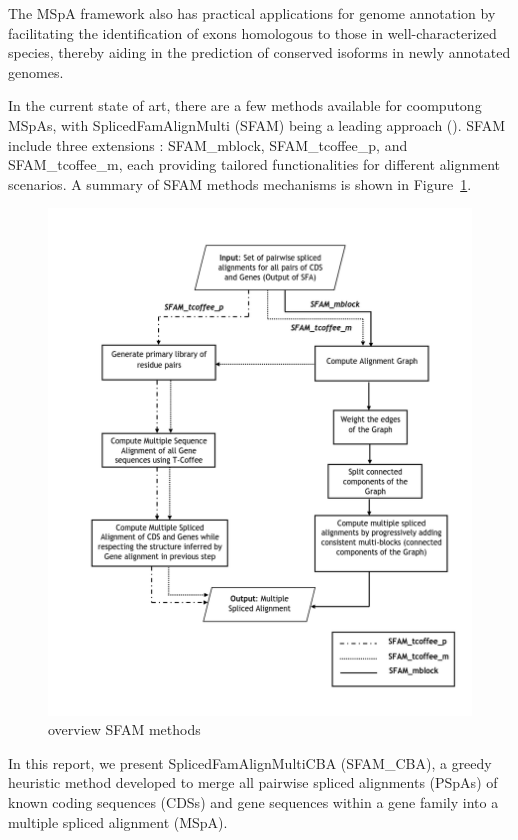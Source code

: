 The MSpA framework also has practical applications for genome annotation by facilitating the identification of exons homologous 
to those in well-characterized species, thereby aiding in the prediction of conserved isoforms in newly annotated genomes.

In the current state of art, there are a few methods available for coomputong MSpAs, with SplicedFamAlignMulti (SFAM) being a 
leading approach (\textit{\citep{jammali2022pairwise}}). SFAM include three extensions : SFAM\_mblock, SFAM\_tcoffee\_p, 
and SFAM\_tcoffee\_m, each providing tailored functionalities for different alignment scenarios. A summary of SFAM methods 
mechanisms is shown in Figure~\ref{fig:spfam-ov}.

\begin{figure}
    \centering
    \includegraphics[width=0.3\linewidth]{figures/overview_spFam_methods.png}
    \caption{overview SFAM methods}
    \label{fig:spfam-ov}
\end{figure}

In this report, we present SplicedFamAlignMultiCBA (SFAM\_CBA), a greedy heuristic method developed to merge all 
pairwise spliced alignments (PSpAs) of known coding sequences (CDSs) and gene sequences within a gene family into a 
multiple spliced alignment (MSpA).

